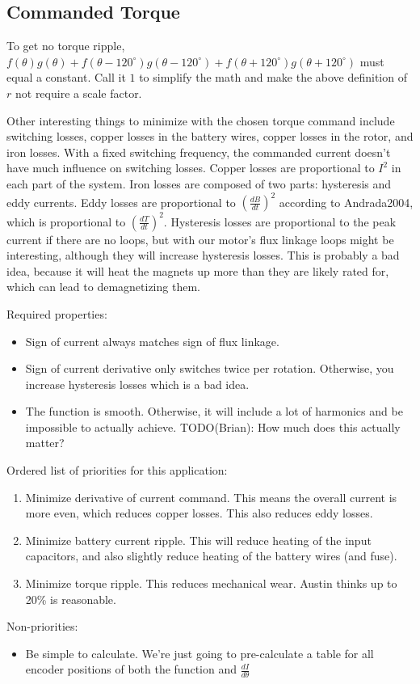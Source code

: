 \documentclass[fleqn]{article}
\begin{document}
\begin{flushleft}
\section{Commanded Torque}
To get no torque ripple,
$f(\theta)g(\theta) +
f(\theta - 120^{\circ})g(\theta - 120^{\circ}) +
f(\theta + 120^{\circ})g(\theta + 120^{\circ})$
must equal a constant.
Call it $1$ to simplify the math and make the above definition of $r$ not
require a scale factor.

Other interesting things to minimize with the chosen torque command include
switching losses, copper losses in the battery wires, copper losses in the
rotor, and iron losses.
With a fixed switching frequency, the commanded current doesn't have much
influence on switching losses.
Copper losses are proportional to $I^2$ in each part of the system.
Iron losses are composed of two parts: hysteresis and eddy currents.
Eddy losses are proportional to $\left(\frac{dB}{dt}\right)^2$
according to Andrada2004, which is proportional to
$\left(\frac{dT}{dt}\right)^2$.
Hysteresis losses are proportional to the peak current if there are no loops,
but with our motor's flux linkage loops might be interesting, although they
will increase hysteresis losses.
This is probably a bad idea, because it will heat the magnets up more than they
are likely rated for, which can lead to demagnetizing them.

Required properties: \begin{itemize}
  \item Sign of current always matches sign of flux linkage.
  \item Sign of current derivative only switches twice per rotation.
    Otherwise, you increase hysteresis losses which is a bad idea.
  \item The function is smooth.
    Otherwise, it will include a lot of harmonics and be impossible to actually
    achieve. TODO(Brian): How much does this actually matter?
\end{itemize}
Ordered list of priorities for this application: \begin{enumerate}
  \item Minimize derivative of current command.
    This means the overall current is more even, which reduces copper losses.
    This also reduces eddy losses.
  \item Minimize battery current ripple.
    This will reduce heating of the input capacitors, and also slightly
    reduce heating of the battery wires (and fuse).
  \item Minimize torque ripple.
    This reduces mechanical wear.
    Austin thinks up to 20\% is reasonable.
\end{enumerate}
Non-priorities: \begin{itemize}
  \item Be simple to calculate. We're just going to pre-calculate a table for
    all encoder positions of both the function and $\frac{dI}{d\theta}$
\end{itemize}


\end{flushleft}
\end{document}
